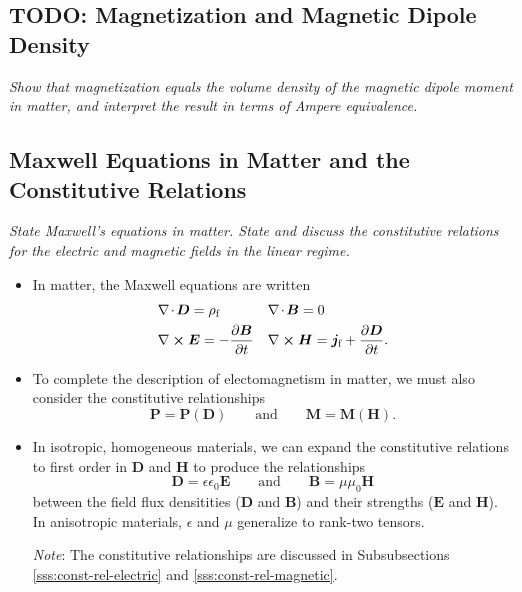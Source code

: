 \documentclass[11pt, a4paper]{article}
\renewcommand{\vec}[1]{\bm{#1}} %
\newcommand{\E}{\vec{E}} %
\newcommand{\D}{\vec{D}}  %
\newcommand{\B}{\vec{B}} %
\renewcommand{\H}{\vec{H}}  %
\renewcommand{\P}{\vec{P}}  %
\newcommand{\M}{\vec{M}}  %
\newcommand{\e}{\epsilon}
\newcommand{\ee}{\epsilon_{0}}  %
\newcommand{\mm}{\mu_{0}}  %
\renewcommand{\j}{\vec{j}}  %
\renewcommand{\div}{\nabla \mspace{-2mu} \cdot \mspace{-2mu}}
\renewcommand{\curl}{\nabla \cross}
\begin{document}
    
\subsection{TODO: Magnetization and Magnetic Dipole Density}
\textit{Show that magnetization equals the volume density of the magnetic dipole moment in matter, and interpret the result in terms of Ampere equivalence.}
    
\subsection{Maxwell Equations in Matter and the Constitutive Relations}
\textit{State Maxwell's equations in matter. State and discuss the constitutive relations for the electric and magnetic fields in the linear regime.}

\begin{itemize}
	\item In matter, the Maxwell equations are written
	\begin{align*}
		& \div \D = \rho_{\text{f}} && \div \B = 0\\
		& \curl \E = - \pdv{\B}{t} &&  \curl \H = \j_{\text{f}} + \pdv{\D}{t}.
	\end{align*}
	
    \item To complete the description of electomagnetism in matter, we must also consider the constitutive relationships
    \begin{equation*}
        \P = \P(\D) \qquad \text{and} \qquad \M = \M(\H).
    \end{equation*}
    
    \item In isotropic, homogeneous materials, we can expand the constitutive relations to first order in $ \D $ and $ \H $ to produce the relationships
    \begin{equation*}
        \D = \e \ee \E \qquad \text{and} \qquad \B = \mu \mm \H
    \end{equation*}
    between the field flux densitities ($ \D $ and $ \B $) and their strengths ($ \E $ and $ \H $).
	In anisotropic materials, $ \e $ and $ \mu $  generalize to rank-two tensors.

    \vspace{2mm}
    \textit{Note}: The constitutive relationships are discussed in Subsubsections \ref{sss:const-rel-electric} and \ref{sss:const-rel-magnetic}.
	
\end{itemize}
\end{document}
